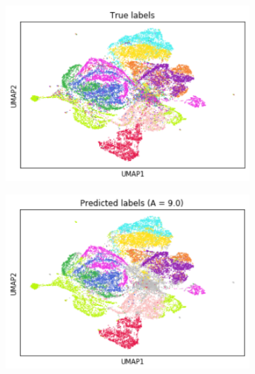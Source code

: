 \documentclass{article}
\begin{document}
\begin{figure}
    \centering
    \begin{subfigure}[t]{0.3\textwidth}
    \centering
        \includegraphics[width=\linewidth]{figs/notMNIST_labels.png} 
    \end{subfigure}
    \begin{subfigure}[t]{0.3\textwidth}
        \centering
        \includegraphics[width=\linewidth]{figs/notMNIST_preds_Aeq9.png} 
    \end{subfigure}
    \begin{subfigure}[t]{0.34\textwidth}
        \centering

\end{subfigure}
\end{figure}
\end{document}
